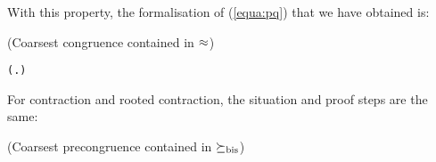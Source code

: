 With this property, the formalisation of (\ref{equa:pq}) that we have
obtained is:
\begin{theorem}{(Coarsest congruence contained in $\approx$)}
\begin{alltt}
\HOLTokenTurnstile{}   \HOLSymConst{\HOLTokenConj{}}   \HOLSymConst{\HOLTokenImp{}} (\HOLSymConst{\HOLTokenForall{}}.  \HOLSymConst{+}  \HOLSymConst{\HOLTokenWeakEQ}  \HOLSymConst{+} ) \HOLSymConst{\HOLTokenImp{}}  \HOLSymConst{\HOLTokenObsCongr} 
\end{alltt}
\end{theorem}

For contraction and rooted contraction, the situation and proof
steps are the same:
\begin{theorem}{(Coarsest precongruence contained in $\mathrel{\succeq_{\rm{bis}}}$)}
\begin{alltt}

\end{alltt}
\end{theorem}
